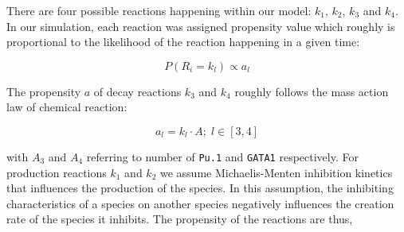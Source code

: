 \documentclass{bioinfo}
\begin{document}
\begin{center}
\end{center}

There are four possible reactions happening within our model: $k_1$, $k_2$, $k_3$ and $k_4$. In our simulation, each reaction was assigned propensity value which roughly is proportional to the likelihood of the reaction happening in a given time:

\begin{equation}
P(R_i = k_l) \propto a_l\label{eq:22}
\end{equation}

The propensity $a$ of decay reactions $k_3$ and $k_4$ roughly follows the mass action law of chemical reaction:

\begin{equation}
a_l = k_l \cdot A {;} \; l \in [3, 4]\label{eq:23}
\end{equation}

with $A_3$ and $A_4$ referring to number of \texttt{Pu.1} and \texttt{GATA1} respectively. For production reactions $k_1$ and $k_2$ we assume Michaelis-Menten inhibition kinetics that influences the production of the species. In this assumption, the inhibiting characteristics of a species on another species negatively influences the creation rate of the species it inhibits. The propensity of the reactions are thus,
\end{document}
